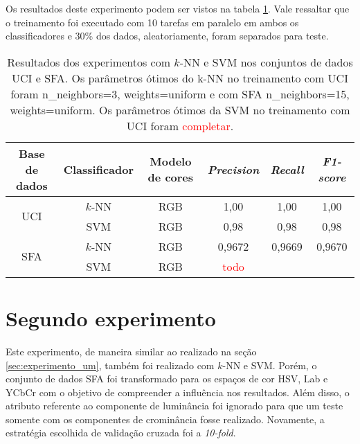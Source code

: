 Os resultados deste experimento podem ser vistos na tabela \ref{tab:resultados_experimento_um}. Vale ressaltar que o treinamento foi executado com 10 tarefas em paralelo em ambos os classificadores e 30\% dos dados, aleatoriamente, foram separados para teste.
\begin{table}[!htpb]
\centering
\begin{small}
\setlength{\tabcolsep}{8pt}

\begin{tabular}{|c|c|c|c|c|c|}\hline
 Base de dados & Classificador & Modelo de cores & \emph{Precision} & \emph{Recall} & \emph{F1-score} \\ \hline
 \multirow{2}{*}{UCI} & $k$-NN & RGB & 1,00 & 1,00 & 1,00 \\ \cline{2-6}
                      & SVM    & RGB & 0,98 & 0,98 & 0,98 \\ \hline
 \multirow{2}{*}{SFA} & $k$-NN & RGB & 0,9672 & 0,9669 & 0,9670 \\ \cline{2-6}
                      & SVM    & RGB & \textcolor{red}{todo} && \\ \hline

\end{tabular}
\end{small}
\caption[Resultados dos experimentos com $k$-NN e SVM nos conjuntos de dados UCI e SFA]{Resultados dos experimentos com $k$-NN e SVM nos conjuntos de dados UCI e SFA. Os parâmetros ótimos do k-NN no treinamento com UCI foram n\_neighbors=3, weights=uniform e com SFA n\_neighbors=15, weights=uniform. Os parâmetros ótimos da SVM no treinamento com UCI foram \textcolor{red}{completar}.}
\label{tab:resultados_experimento_um}
\end{table}


\section{Segundo experimento}
\label{sec:experimento_dois}
Este experimento, de maneira similar ao realizado na seção \ref{sec:experimento_um}, também foi realizado com $k$-NN e SVM. Porém, o conjunto de dados SFA foi transformado para os espaços de cor HSV, Lab e YCbCr com o objetivo de compreender a influência nos resultados. Além disso, o atributo referente ao componente de luminância foi ignorado para que um teste somente com os componentes de crominância fosse realizado. Novamente, a estratégia escolhida de validação cruzada foi a \emph{10-fold}.

